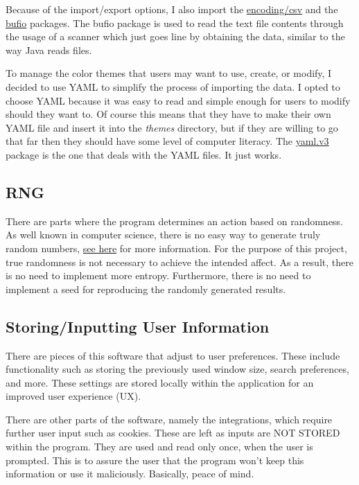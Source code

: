 Because of the import/export options, I also import the
\href{https://pkg.go.dev/encoding/csv}{encoding/csv} and the
\href{https://pkg.go.dev/bufio}{bufio} packages.
The bufio package is used to read the text file contents through the
usage of a scanner which just goes line by obtaining the data,
similar to the way Java reads files.

To manage the color themes that users may want to use, create, or
modify, I decided to use YAML to simplify the process of importing the data.
I opted to choose YAML because it was easy to read and simple enough
for users to modify should they want to. Of course this means that
they have to make their own YAML file and insert it into the
\textit{themes} directory, but if they are willing to go that far
then they should have some level of computer literacy.
The \href{https://pkg.go.dev/gopkg.in/yaml.v3}{yaml.v3} package is
the one that deals with the YAML files. It just works.

\subsection{RNG}

There are parts where the program determines an action based on
randomness. As well known in computer science, there is no easy way
to generate truly random numbers,
\href{https://www.freecodecamp.org/news/true-randomness-in-software-engineering/}{see
here} for more information. For the purpose of this project,
true randomness is not necessary to achieve the intended affect. As a
result, there is no need to implement more entropy. Furthermore,
there is no need to implement a seed for reproducing the randomly
generated results.

\subsection{Storing/Inputting User Information}

There are pieces of this software that adjust to user preferences.
These include functionality such as storing the previously used
window size, search preferences, and more. These settings are stored
locally within the application for an improved user experience (UX).

There are other parts of the software, namely the integrations, which
require further user input such as cookies. These are left as inputs
are NOT STORED within the program. They are used and read only once,
when the user is prompted. This is to assure the user that the
program won't keep this information or use it maliciously. Basically,
peace of mind.

